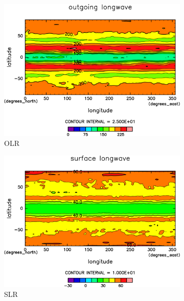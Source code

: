 \documentclass[body]{subfiles}
\begin{document}
\begin{figure}[t]
	\centering
	\begin{subfigure}{.4\textwidth}
		\centering
		\includegraphics[width=\textwidth]{S1366/OLR,time=14600:14965-crop-rotate.pdf}
		\caption{OLR \hmu*{[W/m^{-2}]}}\label{S1366OLR}
	\end{subfigure}
	\begin{subfigure}{.4\textwidth}
		\centering
		\includegraphics[width=\textwidth]{S1366/SLR,time=14600:14965-crop-rotate.pdf}
		\caption{SLR\hmu*{[W/m^{-2}]}}\label{S1366SLR}
	\end{subfigure}
	\begin{subfigure}{.4\textwidth}
		\centering

\end{subfigure}
\end{figure}
\end{document}
